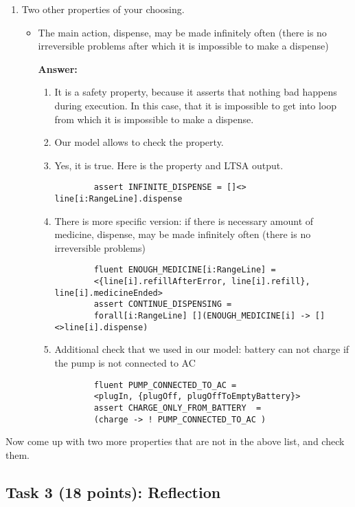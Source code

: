 \documentclass{article}
\newcommand{\head}{\subsection*}
\begin{document}
\begin{enumerate}
    \item Two other properties of your choosing.
    
    \begin{itemize}
    \item The main action, dispense, may be made infinitely often (there is no irreversible problems after which it is
    impossible to make a dispense)
    
    \textbf{Answer:}
    \begin{enumerate}
    	\item It is a safety property, because it asserts that nothing bad happens during execution. In this case, that it is
    	impossible to get into loop from which it is impossible to make a dispense.
    	\item Our model allows to check the property. 
    	\item Yes, it is true. Here is the property and LTSA output.
    	\begin{verbatim}    	
    	assert INFINITE_DISPENSE = []<> line[i:RangeLine].dispense
    	 \end{verbatim}
    	 
    	 \item There is more specific version: if there is necessary amount of medicine, dispense, may be made infinitely
    	 often (there is no irreversible problems)
    	 
    	 \begin{verbatim}
    	fluent ENOUGH_MEDICINE[i:RangeLine] =
    	<{line[i].refillAfterError, line[i].refill}, line[i].medicineEnded>
    	assert CONTINUE_DISPENSING =
    	forall[i:RangeLine] [](ENOUGH_MEDICINE[i] -> [] <>line[i].dispense)
    	\end{verbatim}
    	
    	\item Additional check that we used in our model: battery can not charge if the pump is not connected to AC
    	
    	 \begin{verbatim}
    	fluent PUMP_CONNECTED_TO_AC =
    	<plugIn, {plugOff, plugOffToEmptyBattery}>
    	assert CHARGE_ONLY_FROM_BATTERY  = 
    	(charge -> ! PUMP_CONNECTED_TO_AC )
    	\end{verbatim}
    	\end{enumerate}
    	\end{itemize}
    	    
\end{enumerate}

Now come up with two more properties that are not in the above list, and check them.
\head{Task 3 (18 points): Reflection}
\end{document}
